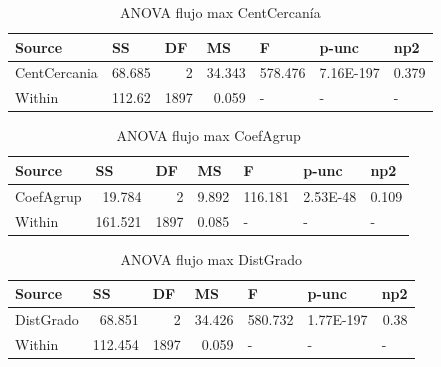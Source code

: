 \documentclass{article}
\begin{document}
\begin{table}[htbp]
  \centering
  \caption{ANOVA flujo max CentCercanía}
    \begin{tabular}{lrrrlll}
    \textbf{Source} & \multicolumn{1}{l}{\textbf{SS}} & \multicolumn{1}{l}{\textbf{DF}} & \multicolumn{1}{l}{\textbf{MS}} & \textbf{F} & \textbf{p-unc} & \textbf{np2} \\
    \midrule
    CentCercania & 68.685 & 2     & 34.343 & \multicolumn{1}{r}{578.476} & \multicolumn{1}{r}{7.16E-197} & \multicolumn{1}{r}{0.379} \\
    Within & 112.62 & 1897  & 0.059 & -     & -     & - \\
    \bottomrule
    \end{tabular}%
  \label{tab:addlabel}%
\end{table}%
\begin{table}[htbp]
  \centering
  \caption{ANOVA flujo max CoefAgrup}
    \begin{tabular}{lrrrlll}
    \textbf{Source} & \multicolumn{1}{l}{\textbf{SS}} & \multicolumn{1}{l}{\textbf{DF}} & \multicolumn{1}{l}{\textbf{MS}} & \textbf{F} & \textbf{p-unc} & \textbf{np2} \\
    \midrule
    CoefAgrup & 19.784 & 2     & 9.892 & \multicolumn{1}{r}{116.181} & \multicolumn{1}{r}{2.53E-48} & \multicolumn{1}{r}{0.109} \\
    Within & 161.521 & 1897  & 0.085 & -     & -     & - \\
    \bottomrule
    \end{tabular}%
  \label{tab:addlabel}%
\end{table}%

\begin{table}[htbp]
  \centering
  \caption{ANOVA flujo max DistGrado}
    \begin{tabular}{lrrrlll}
    \textbf{Source} & \multicolumn{1}{l}{\textbf{SS}} & \multicolumn{1}{l}{\textbf{DF}} & \multicolumn{1}{l}{\textbf{MS}} & \textbf{F} & \textbf{p-unc} & \textbf{np2} \\
    \midrule
    DistGrado & 68.851 & 2     & 34.426 & \multicolumn{1}{r}{580.732} & \multicolumn{1}{r}{1.77E-197} & \multicolumn{1}{r}{0.38} \\
    Within & 112.454 & 1897  & 0.059 & -     & -     & - \\
    \bottomrule
    \end{tabular}%
  \label{tab:addlabel}%
\end{table}%
\end{document}
